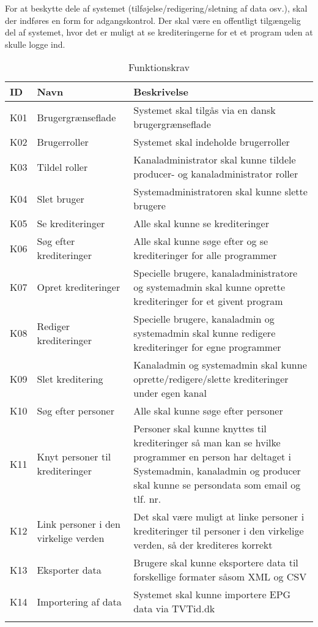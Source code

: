 \noindent
For at beskytte dele af systemet (tilføjelse/redigering/sletning af data osv.), skal der indføres en form for adgangskontrol. Der skal være en offentligt tilgængelig del af systemet, hvor det er muligt at se krediteringerne for et et program uden at skulle logge ind.



\begin{longtable}[h]{ |p{1cm}|p{4cm}|p{11cm}| }

\hline
\textbf{ID} & \textbf{Navn} & \textbf{Beskrivelse} \\
\hline
K01 & Brugergrænseflade & Systemet skal tilgås via en dansk brugergrænseflade \\
\hline
K02 & Brugerroller & Systemet skal indeholde brugerroller \\
\hline
\label{K03}K03 & Tildel roller & Kanaladministrator skal kunne tildele producer- og kanaladministrator roller \\
\hline
K04 & Slet bruger & Systemadministratoren skal kunne slette brugere \\
\hline
K05 & Se krediteringer & Alle skal kunne se krediteringer \\
\hline
K06 & Søg efter krediteringer & Alle skal kunne søge efter og se krediteringer for alle programmer \\
\hline
K07 & Opret krediteringer & Specielle brugere, kanaladministratore og systemadmin skal kunne oprette
krediteringer for et givent program \\
\hline
K08 & Rediger krediteringer & Specielle brugere, kanaladmin og systemadmin skal kunne redigere krediteringer for egne programmer \\
\hline
K09 & Slet kreditering & Kanaladmin og systemadmin skal kunne oprette/redigere/slette krediteringer under egen kanal \\
\hline
K10 & Søg efter personer & Alle skal kunne søge efter personer \\
\hline
K11 & Knyt personer til krediteringer & Personer skal kunne knyttes til krediteringer så man kan se hvilke programmer en person har deltaget i Systemadmin, kanaladmin og producer skal kunne se persondata som email og tlf. nr. \\
\hline
K12 & Link personer i den virkelige verden & Det skal være muligt at linke personer i krediteringer til personer i den virkelige verden, så der krediteres korrekt \\
\hline
K13 & Eksporter data & Brugere skal kunne eksportere data til forskellige formater såsom XML og CSV \\
\hline
K14 & Importering af data & Systemet skal kunne importere EPG data via TVTid.dk \\
\hline
\caption{Funktionskrav}
\label{table:funktionskrav}
\end{longtable} 


